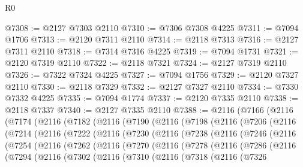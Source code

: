 \begin{lexlean}{R0}
\begin{coremodule}
@7308 := @2127 @7303 @2110
@7310 := @7306 @7308 @4225
@7311 := @7094 @1706
@7313 := @2120 @7311 @2110
@7314 := @2118 @7313
@7316 := @2127 @7311 @2110
@7318 := @7314 @7316 @4225
@7319 := @7094 @1731
@7321 := @2120 @7319 @2110
@7322 := @2118 @7321
@7324 := @2127 @7319 @2110
@7326 := @7322 @7324 @4225
@7327 := @7094 @1756
@7329 := @2120 @7327 @2110
@7330 := @2118 @7329
@7332 := @2127 @7327 @2110
@7334 := @7330 @7332 @4225
@7335 := @7094 @1774
@7337 := @2120 @7335 @2110
@7338 := @2118 @7337
@7340 := @2127 @7335 @2110
@7388 := @2116
    (@7166
      (@2116
        (@7174
          (@2116
            (@7182
              (@2116
                (@7190
                  (@2116
                    (@7198
                      (@2116
                        (@7206
                          (@2116
                            (@7214
                              (@2116
                                (@7222
                                  (@2116
                                    (@7230
                                      (@2116
                                        (@7238
                                          (@2116
                                            (@7246
                                              (@2116
                                                (@7254
                                                  (@2116
                                                    (@7262
                                                      (@2116
                                                        (@7270
                                                          (@2116
                                                            (@7278
                                                              (@2116
                                                                (@7286
                                                                  (@2116
                                                                    (@7294
                                                                      (@2116
                                                                        (@7302
                                                                          (@2116
                                                                            (@7310
                                                                              (@2116
                                                                                (@7318
                                                                                  (@2116
                                                                                    (@7326

\end{coremodule}
\end{lexlean}
